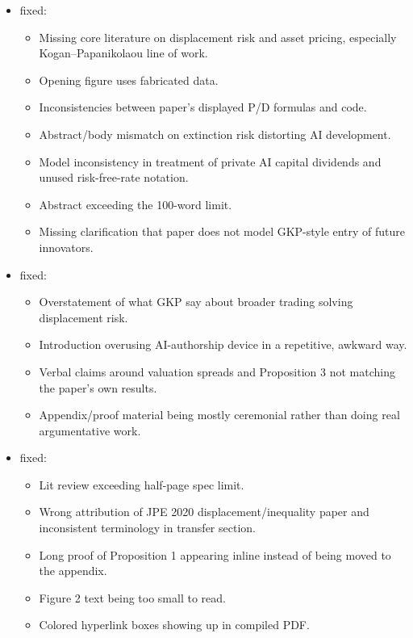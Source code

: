 \documentclass[12pt]{article}
\begin{document}
\begin{itemize}
\item {} fixed:
\begin{itemize}
\item Missing core literature on displacement risk and asset pricing, especially Kogan--Papanikolaou line of work.
\item Opening figure uses fabricated data.
\item Inconsistencies between paper's displayed P/D formulas and code.
\item Abstract/body mismatch on extinction risk distorting AI development.
\item Model inconsistency in treatment of private AI capital dividends and unused risk-free-rate notation.
\item Abstract exceeding the 100-word limit.
\item Missing clarification that paper does not model GKP-style entry of future innovators.
\end{itemize}

\item {} fixed:
\begin{itemize}
\item Overstatement of what GKP say about broader trading solving displacement risk.
\item Introduction overusing AI-authorship device in a repetitive, awkward way.
\item Verbal claims around valuation spreads and Proposition 3 not matching the paper's own results.
\item Appendix/proof material being mostly ceremonial rather than doing real argumentative work.
\end{itemize}

\item {} fixed:
\begin{itemize}
\item Lit review exceeding half-page spec limit.
\item Wrong attribution of JPE 2020 displacement/inequality paper and inconsistent terminology in transfer section.
\item Long proof of Proposition 1 appearing inline instead of being moved to the appendix.
\item Figure 2 text being too small to read.
\item Colored hyperlink boxes showing up in compiled PDF.
\end{itemize}


\end{itemize}
\end{document}
